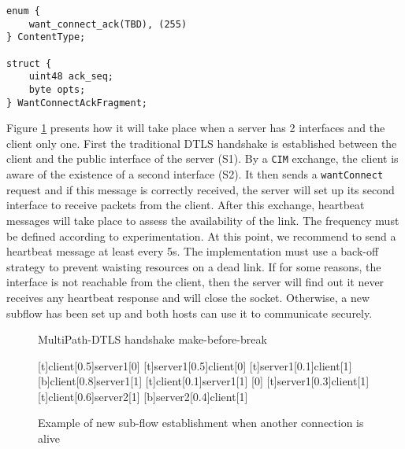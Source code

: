 \begin{lstlisting}[caption= wantConnectAck message, label=lst:WantConnectAck]
enum {
    want_connect_ack(TBD), (255)
} ContentType;

struct {
    uint48 ack_seq;
    byte opts;
} WantConnectAckFragment;
\end{lstlisting}

Figure \ref{fig:Handshake1} presents how it will take place when a server has 2 interfaces and the client only one. First the traditional DTLS handshake is established between the client and the public interface of the server (S1). By a \texttt{CIM} exchange, the client is aware of the existence of a second interface (S2). It then sends a \texttt{wantConnect} request and if this message is correctly received, the server will set up its second interface to receive packets from the client. After this exchange, heartbeat messages will take place to assess the availability of the link. The frequency must be defined according to experimentation. At this point, we recommend to send a heartbeat message at least every 5s. The implementation must use a back-off strategy to prevent waisting resources on a dead link. If for some reasons, the interface is not reachable from the client, then the server will find out it never receives any heartbeat response and will close the socket. Otherwise, a new subflow has been set up and both hosts can use it to communicate securely. 


\begin{figure}[!ht]
\centering
\begin{msc}[r]{MultiPath-DTLS handshake make-before-break}

\setlength{\instfootheight}{0em}
\setlength{\instheadheight}{0em}
\setlength{\instdist}{0.33\linewidth}
\setlength{\levelheight}{3em}


[t]{client}[0.5]{server1}[0]
\nextlevel
{}[t]{server1}[0.5]{client}[0]
\nextlevel
{}[t]{server1}[0.1]{client}[1]
\nextlevel
{}[b]{client}[0.8]{server1}[1]
\nextlevel[2]
[t]{client}[0.1]{server1}[1]
\nextlevel
{}
[0]
[t]{server1}[0.3]{client}[1]
\nextlevel
{}
\nextlevel
{}[t]{client}[0.6]{server2}[1]
\nextlevel
{}[b]{server2}[0.4]{client}[1]
\nextlevel[2]

\end{msc}
\caption{Example of new sub-flow establishment when another connection is alive}
\label{fig:Handshake1}
\end{figure}

